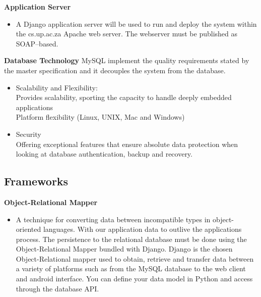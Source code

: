 \documentclass[12pt]{article}
\begin{document}
		\indent\indent\indent\linebreak\textbf{Application Server}
		\begin{itemize}
		\item A Django application server will be used to run and deploy the system within the cs.up.ac.za Apache web server. The webserver must be published as SOAP–based.
		
		\end{itemize}                                
		\indent\indent\indent\linebreak\textbf{Database Technology}
		MySQL implement the quality requirements stated by the master specification and it decouples the system from the database. 
		\begin{itemize}
			\item Scalability and Flexibility: \\
				Provides scalability, sporting the capacity to handle deeply embedded applications \\
				Platform flexibility (Linux, UNIX, Mac and Windows)
			\item Security \\
				Offering exceptional features that ensure absolute data protection when looking at database authentication, backup and recovery.
		\end{itemize}
		
		\vspace{0.5cm}
	
	\subsection{Frameworks}
	
		\vspace{0.5cm}
	
		\indent\indent \textbf{Object-Relational Mapper}
		\begin{itemize}
		\item A technique for converting data between incompatible types in object-oriented languages. With our application data to outlive the applications process. 
		The persistence to the relational database must be done using the Object-Relational Mapper bundled with Django. Django is the chosen Object-Relational mapper used to obtain, retrieve and transfer data between a variety of platforms such as from the MySQL database to the web client and android interface. You can define your data model in Python and access through the database API.
		\end{itemize}
		
\end{document}
